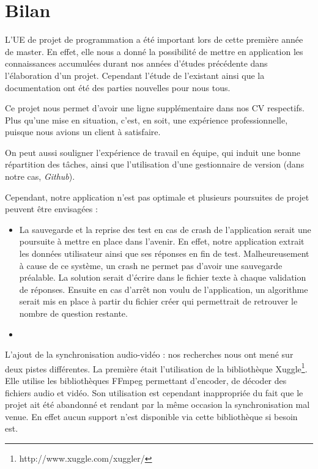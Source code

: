 \chapter{Bilan}


L'UE de projet de programmation a été important lors de cette première année de master. En effet, elle nous a donné la possibilité de mettre en application les connaissances accumulées durant nos années d'études précédente dans l'élaboration d'un projet. Cependant l'étude de l'existant ainsi que la documentation ont été des parties nouvelles pour nous tous.

Ce projet nous permet d'avoir une ligne supplémentaire dans nos CV respectifs. Plus qu'une mise en situation, c'est, en soit, une expérience professionnelle, puisque nous avions un client à satisfaire.

On peut aussi souligner l'expérience de travail en équipe, qui induit une bonne répartition des tâches, ainsi que l'utilisation d'une gestionnaire de version (dans notre cas, \textit{Github}).

Cependant, notre application n'est pas optimale et plusieurs poursuites de projet peuvent être envisagées :

\begin{itemize}
 \item La sauvegarde et la reprise des test en cas de crash de l'application serait une poursuite à mettre en place dans l'avenir. En effet, notre application extrait les données utilisateur ainsi que ses réponses en fin de test. Malheureusement à cause de ce système, un crash ne permet pas d'avoir une sauvegarde préalable. La solution serait d'écrire dans le fichier texte à chaque validation de réponses. Ensuite en cas d'arrêt non voulu de l'application, un algorithme serait mis en place à partir du fichier créer qui permettrait de retrouver le nombre de question restante.
 \item 
\end{itemize}


L'ajout de la synchronisation audio-vidéo : nos recherches nous ont mené sur deux pistes différentes. La première était l'utilisation de la bibliothèque Xuggle\footnote{http://www.xuggle.com/xuggler/}. Elle utilise les bibliothèques FFmpeg permettant d'encoder, de décoder des fichiers audio et vidéo.
Son utilisation est cependant inappropriée du fait que le projet ait été abandonné et rendant par la même occasion la synchronisation mal venue. En effet aucun support n'est disponible via cette bibliothèque si besoin est.

